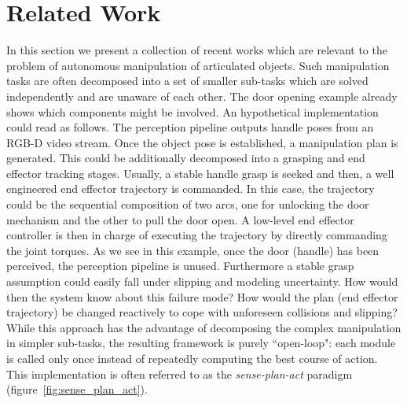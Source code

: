 \section{Related Work}
\label{sec:Related Work}


In this section we present a collection of recent works which are relevant to the problem of autonomous manipulation of articulated objects. Such manipulation tasks are often decomposed into a set of smaller sub-tasks which are solved independently and are unaware of each other. The door opening example already shows which components might be involved. An hypothetical implementation could read as follows. The perception pipeline outputs handle poses from an RGB-D video stream. Once the object pose is established, a manipulation plan is generated. This could be additionally decomposed into a grasping and end effector tracking stages. Usually, a stable handle grasp is seeked and then, a well engineered end effector trajectory is commanded. In this case, the trajectory could be the sequential composition of two arcs, one for unlocking the door mechanism and the other to pull the door open. A low-level end effector controller is then in charge of executing the trajectory by directly commanding the joint torques. As we see in this example, once the door (handle) has been perceived, the perception pipeline is unused. Furthermore a stable grasp assumption could easily fall under slipping and modeling uncertainty. How would then the system know about this failure mode? How would the plan (end effector trajectory) be changed reactively to cope with unforeseen collisions and slipping? While this approach has the advantage of decomposing the complex manipulation in simpler sub-tasks, the resulting framework is purely ``open-loop": each module is called only once instead of repeatedly computing the best course of action. This implementation is often referred to as the \emph{sense-plan-act} paradigm (figure~\ref{fig:sense_plan_act}).     


